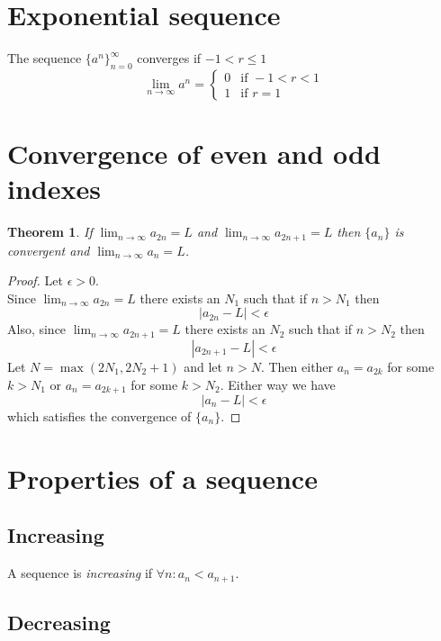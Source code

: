 \documentclass{article}
\begin{document}
\section{Exponential sequence} %

The sequence \({\{a^n\}}_{n=0}^\infty\) converges if \(-1<r\leq 1\)
\[
    \lim_{n\to\infty} a^n = \begin{cases}
        0 & \text{if } -1 < r < 1 \\
        1 & \text{if } r=1
    \end{cases}
\]

\pagebreak

\section{Convergence of even and odd indexes}

\newtheorem*{theorem1}{Theorem}

\begin{theorem1}
    If \(\lim_{n\to\infty}a_{2n}=L\) and \(\lim_{n\to\infty}a_{2n+1}=L\)
    then \(\{a_n\}\) is convergent and \(\lim_{n\to\infty}a_n=L\).
\end{theorem1}
\begin{proof}
    Let \(\epsilon>0\). \\
    Since \(\lim_{n\to\infty}a_{2n}=L\) there exists an \(N_1\) such that
    if \(n>N_1\) then
    \[
        |a_{2n}-L|<\epsilon
    \]
    Also, since \(\lim_{n\to\infty}a_{2n+1}=L\) there exists an \(N_2\) such that
    if \(n>N_2\) then
    \[
        |a_{2n+1}-L|<\epsilon
    \]
    Let \(N=\max(2N_1, 2N_2+1)\) and let \(n>N\).
    Then either \(a_n=a_{2k}\) for some \(k>N_1\) or \(a_n=a_{2k+1}\)
    for some \(k>N_2\). Either way we have
    \[
        |a_n-L|<\epsilon
    \]
    which satisfies the convergence of \(\{a_n\}\).
\end{proof}

\section{Properties of a sequence}

\subsection{Increasing}

A sequence is \textit{increasing} if \(\forall n:  a_n<a_{n+1}\).

\subsection{Decreasing}
\end{document}

